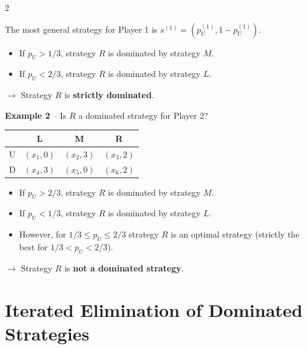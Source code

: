 \documentclass[a4paper,9pt]{extarticle}
\begin{document}
\begin{multicols}{2}
\begin{example}
The most general strategy for Player 1 is $s^{(1)} = (p_U^{(1)}, 1 - p_U^{(1)})$.

\begin{itemize}

\item If $p_U > 1/3$, strategy $R$ is dominated by strategy $M$.

\item If $p_U < 2/3$, strategy $R$ is dominated by strategy $L$.

\end{itemize}

$\rightarrow$ Strategy $R$ is \textbf{strictly dominated}.

\end{example}


\begin{example}

\textbf{Example 2} -- Is $R$ a dominated strategy for Player 2?

\begin{center}
\begin{tabular}{c|ccc}
 & L & M & R \\
\hline
U & $(x_1,0)$ & $(x_2,3)$ & $(x_3,2)$ \\
D & $(x_4,3)$ & $(x_5,0)$ & $(x_6,2)$ \\
\end{tabular}
\end{center}

\begin{itemize}

\item If $p_U > 2/3$, strategy $R$ is dominated by strategy $M$.

\item If $p_U < 1/3$, strategy $R$ is dominated by strategy $L$.

\item However, for $1/3 \le p_U \le 2/3$ strategy $R$ is an optimal strategy (strictly the
best for $1/3 < p_U < 2/3$).

\end{itemize}

$\rightarrow$ Strategy $R$ is \textbf{not a dominated strategy}.

\end{example}



\section{Iterated Elimination of Dominated Strategies}



\end{multicols}
\end{document}

